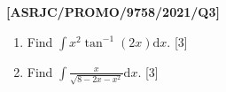 \item \textbf{{[}ASRJC/PROMO/9758/2021/Q3{]}}
\begin{enumerate}
\item Find $\int x^{2}\tan^{-1}\left(2x\right)\text{d}x$. \hfill{}{[}3{]}
\item Find $\int\frac{x}{\sqrt{8-2x-x^{2}}}\text{d}x$. \hfill{}{[}3{]}
\end{enumerate}